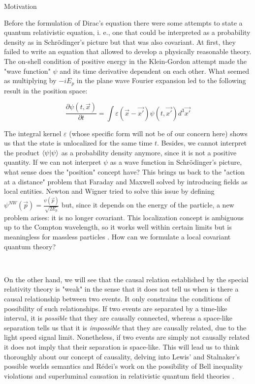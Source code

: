 \documentclass[12pt]{article}
\begin{document}
\begin{section}{Motivation}

Before the formulation of Dirac's equation there were some attempts to state a quantum relativistic equation, i. e., one that could be interpreted as a probability density as in Schrödinger's picture but that was also covariant. At first, they failed to write an equation that allowed to develop a physically reasonable theory. The on-shell condition of positive energy in the Klein-Gordon attempt made the "wave function" $\psi$ and its time derivative dependent on each other. What seemed as multiplying by $-iE_p$ in the plane wave Fourier expansion led to the following result in the position space:

\begin{equation}
\frac{\partial \psi (t,\vec{x})}{\partial t} = \int \varepsilon (\vec{x} - \vec{x'}) \psi (t, \vec{x'}) d^3 \vec{x'}
\end{equation}

The integral kernel $\varepsilon$ (whose specific form will not be of our concern here) shows us that the state is unlocalized for the same time $t$. Besides, we cannot interpret the product $\bra{\psi}\ket{\psi}$ as a probability density anymore, since it is not a positive quantity. If we can not interpret $\psi$ as a wave function in Schrödinger's picture, what sense does the "position" concept have? This brings us back to the "action at a distance" problem that Faraday and Maxwell solved by introducing fields as local entities. Newton and Wigner tried to solve this issue by defining $\psi ^{NW} (\vec{p}) = \frac{\psi (\vec{p})}{\sqrt{2E_p}}$ but, since it depends on the energy of the particle, a new problem arises: it is no longer covariant. This localization concept is ambiguous up to the Compton wavelength, so it works well within certain limits but is meaningless for massless particles \cite{haag_local_1996}. How can we formulate a local covariant quantum theory?

\

On the other hand, we will see that the causal relation established by the special relativity theory is "weak" in the sense that it does not tell us when is there a causal relationship between two events. It only constrains the conditions of possibility of such relationships. If two events are separated by a time-like interval, it is \textit{possible} that they are causally connected, whereas a space-like separation tells us that it is \textit{impossible} that they are causally related, due to the light speed signal limit. Nonetheless, if two events are simply not causally related it does not imply that their separation is space-like. This will lead us to think thoroughly about our concept of causality, delving into Lewis' and Stalnaker's possible worlds semantics \cite{lewis_causation_1973} and Rédei's work on the possibility of Bell inequality violations and superluminal causation in relativistic quantum field theories \cite{redei_is_1996}.

\end{section}
\end{document}
